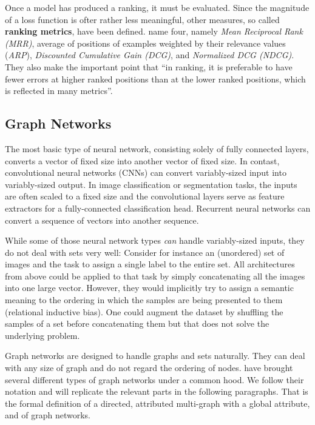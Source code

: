 Once a model has produced a ranking, it must be evaluated. Since the magnitude of a loss function is ofter rather less meaningful, other measures, so called \textbf{ranking metrics}, have been defined. \cite{tfranking} name four, namely \textit{Mean Reciprocal Rank (MRR)}, average of positions of examples weighted by their relevance values (\textit{ARP}), \textit{Discounted Cumulative Gain (DCG)}, and \textit{Normalized DCG (NDCG)}. They also make the important point that ``in ranking, it is preferable to have fewer errors at higher ranked positions than at the lower ranked positions, which is reflected in many metrics''.

\subsection{Graph Networks}
\label{sec:graphnetworks}

The most basic type of neural network, consisting solely of fully connected layers, converts a vector of fixed size into another vector of fixed size.
In contast, convolutional neural networks (CNNs) can convert variably-sized input into variably-sized output. In image classification or segmentation tasks, the inputs are often scaled to a fixed size and the convolutional layers serve as feature extractors for a fully-connected classification head.
Recurrent neural networks can convert a sequence of vectors into another sequence.

While some of those neural network types \textit{can} handle variably-sized inputs, they do not deal with sets very well: Consider for instance an (unordered) set of images and the task to assign a single label to the entire set. All architectures from above could be applied to that task by simply concatenating all the images into one large vector. However, they would implicitly try to assign a semantic meaning to the ordering in which the samples are being presented to them (relational inductive bias). One could augment the dataset by shuffling the samples of a set before concatenating them but that does not solve the underlying problem.

Graph networks are designed to handle graphs and sets naturally. They can deal with any size of graph and do not regard the ordering of nodes. \cite{deepmind:graphnets} have brought several different types of graph networks under a common hood. We follow their notation and will replicate the relevant parts in the following paragraphs. That is the formal definition of a directed, attributed multi-graph with a global attribute, and of graph networks.

